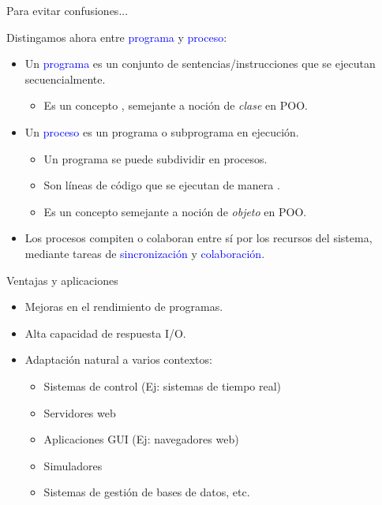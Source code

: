 \documentclass[handout]{beamer} %
\newcommand{\blue}[1]{\textcolor{blue}{#1}}
\newcommand{\redb}[1]{{\color{red!70!black}{#1}}}
\begin{document}
\begin{frame}{Para evitar confusiones...}
  
  Distingamos ahora entre \blue{programa} y \blue{proceso}:
  \begin{itemize}
    \item<2-> Un \blue{programa} es un conjunto de sentencias/instrucciones que se ejecutan secuencialmente.
    \begin{itemize}
        \item Es un concepto \redb{estático}, semejante a noción de {\em clase} en POO.
    \end{itemize}
    \item<3-> Un \blue{proceso} es un programa o subprograma en ejecución.
    \begin{itemize}
        \item Un programa se puede subdividir en procesos.
        \item Son líneas de código que se ejecutan de manera \redb{dinámica}.
        \item Es un concepto semejante a noción de {\em objeto} en POO.
    \end{itemize}
  \end{itemize}
  \begin{itemize}
    \item<5-> Los procesos compiten o colaboran entre sí por los recursos del sistema, mediante tareas de \blue{sincronización} y \blue{colaboración}.
  \end{itemize}
\end{frame}

\begin{frame}{Ventajas y aplicaciones}
  \begin{itemize}
    \item<2-> Mejoras en el rendimiento de programas.
    \item<2-> Alta capacidad de respuesta I/O.
    \item<2-> Adaptación natural a varios contextos:
    \begin{itemize}
        \item Sistemas de control (Ej: sistemas de tiempo real)
        \item Servidores web
        \item Aplicaciones GUI (Ej: navegadores web)
        \item Simuladores
        \item Sistemas de gestión de bases de datos, etc.
    \end{itemize}
  \end{itemize}
\end{frame}
\end{document}
